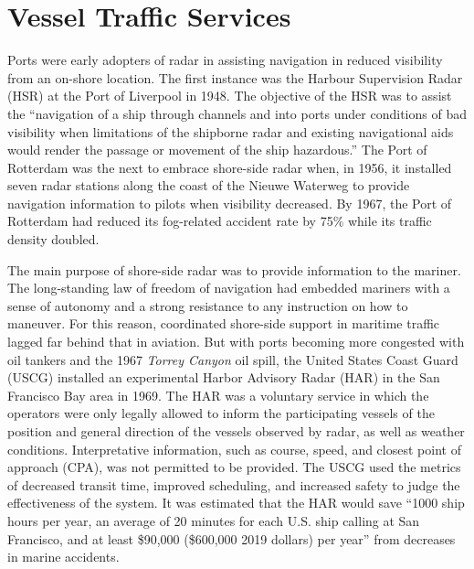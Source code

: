 \documentclass[twoside,symmetric,notoc]{tufte-book}
\begin{document}
\section{Vessel Traffic Services}
\par{%
Ports were early adopters of radar in assisting navigation in reduced visibility from an on-shore location. The first instance was the Harbour Supervision Radar (HSR) at the Port of Liverpool in 1948.\cite{Satow} The objective of the HSR was to assist the ``navigation of a ship through channels and into ports under conditions of bad visibility when limitations of the shipborne radar and existing navigational aids would render the passage or movement of the ship hazardous.''\cite{Fennessy} The Port of Rotterdam was the next to embrace shore-side radar when, in 1956, it installed seven radar stations along the coast of the Nieuwe Waterweg to provide navigation information to pilots when visibility decreased.\cite{Prins} By 1967, the Port of Rotterdam had reduced its fog-related accident rate by 75\% while its traffic density doubled.\cite{Exxon}
}
\par{%
The main purpose of shore-side radar was to provide information to the mariner. The long-standing law of freedom of navigation had embedded mariners with a sense of autonomy and a strong resistance to any instruction on how to maneuver. For this reason, coordinated shore-side support in maritime traffic lagged far behind that in aviation. But with ports becoming more congested with oil tankers and the 1967 \textit{Torrey Canyon} oil spill, the United States Coast Guard (USCG) installed an experimental Harbor Advisory Radar (HAR) in the San Francisco Bay area in 1969. The HAR was a voluntary service in which the operators were only legally allowed to inform the participating vessels of the position and general direction of the vessels observed by radar, as well as weather conditions. Interpretative information, such as course, speed, and closest point of approach (CPA), was not permitted to be provided. The USCG used the metrics of decreased transit time, improved scheduling, and increased safety to judge the effectiveness of the system. It was estimated that the HAR would save ``1000 ship hours per year, an average of 20 minutes for each U.S. ship calling at San Francisco, and \textellipsis at least \$90,000 (\texttildelow\$600,000 2019 dollars) per year'' from decreases in marine accidents.\cite[-0.5in]{Geonatuics}
}
\end{document}
